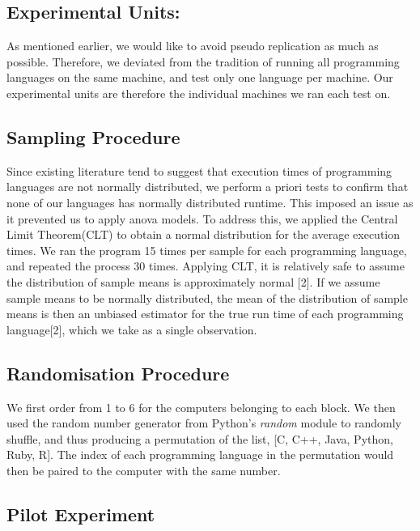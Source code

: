 \documentclass[12pt,halfline,a4paper,]{ouparticle}
\begin{document}
\subsection{Experimental Units:}\label{experimental-units}

As mentioned earlier, we would like to avoid pseudo replication as much
as possible. Therefore, we deviated from the tradition of running all
programming languages on the same machine, and test only one language
per machine. Our experimental units are therefore the individual
machines we ran each test on.

\subsection{Sampling Procedure}\label{sampling-procedure}

Since existing literature tend to suggest that execution times of
programming languages are not normally distributed, we perform a priori
tests to confirm that none of our languages has normally distributed
runtime. This imposed an issue as it prevented us to apply anova models.
To address this, we applied the Central Limit Theorem(CLT) to obtain a
normal distribution for the average execution times. We ran the program
15 times per sample for each programming language, and repeated the
process 30 times. Applying CLT, it is relatively safe to assume the
distribution of sample means is approximately normal {[}2{]}. If we
assume sample means to be normally distributed, the mean of the
distribution of sample means is then an unbiased estimator for the true
run time of each programming language{[}2{]}, which we take as a single
observation.

\subsection{Randomisation Procedure}\label{randomisation-procedure}

We first order from 1 to 6 for the computers belonging to each block. We
then used the random number generator from Python's \emph{random} module
to randomly shuffle, and thus producing a permutation of the list, {[}C,
C++, Java, Python, Ruby, R{]}. The index of each programming language in
the permutation would then be paired to the computer with the same
number.

\subsection{Pilot Experiment}\label{pilot-experiment}
\end{document}
